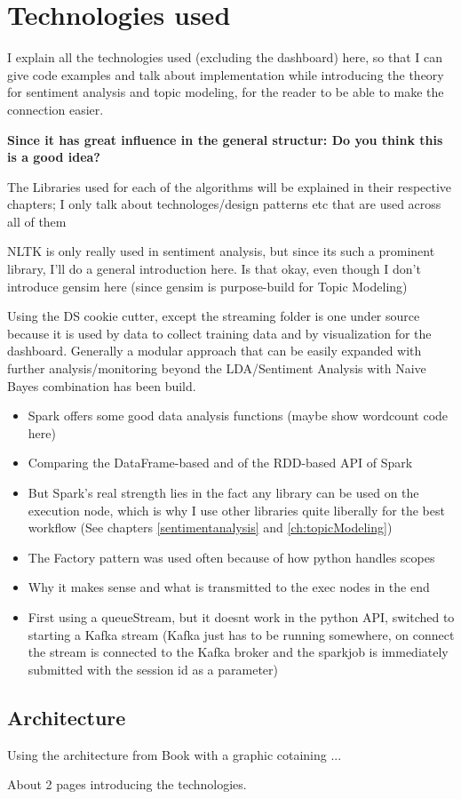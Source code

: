
\chapter{Technologies used}

\label{ch:technologiesUsed}

I explain all the technologies used (excluding the dashboard) here, so that I can give code examples and talk about implementation
while introducing the theory for sentiment analysis and topic modeling, for the reader to be able to make the connection easier.

\textbf{Since it has great influence in the general structur: Do you think this is a good idea?}

The Libraries used for each of the algorithms will be explained in their respective chapters;
I only talk about technologes/design patterns etc that are used across all of them

NLTK is only really used in sentiment analysis, but since its such a prominent library, I'll do a general introduction here.
Is that okay, even though I don't introduce gensim here (since gensim is purpose-build for Topic Modeling)

Using the DS cookie cutter, except the streaming folder is one under source because it is used by data to collect training data and by visualization for the dashboard.
Generally a modular approach that can be easily expanded with further analysis/monitoring beyond the LDA/Sentiment Analysis with Naive Bayes combination has been build.

\begin{itemize}
    \item
    Spark offers some good data analysis functions (maybe show wordcount code here)
    \item
    Comparing the DataFrame-based and of the RDD-based API of Spark
    \item
    But Spark's real strength lies in the fact any library can be used on the execution node, which is why I use other libraries quite liberally for the best workflow (See chapters \ref{sentimentanalysis} and \ref{ch:topicModeling})
    \item
    The Factory pattern was used often because of how python handles scopes
    \item
    Why it makes sense and what is transmitted to the exec nodes in the end
    \item
    First using a queueStream, but it doesn\’t work in the python API, switched to starting a Kafka stream (Kafka just has to be running somewhere, on connect the stream is connected to the Kafka broker and the sparkjob is immediately submitted with the session id as a parameter)


\end{itemize}

\section{Architecture}
\label{sec:architecture}

Using the architecture from Book with a graphic cotaining ...

About 2 pages introducing the technologies.

\pagebreak[2]